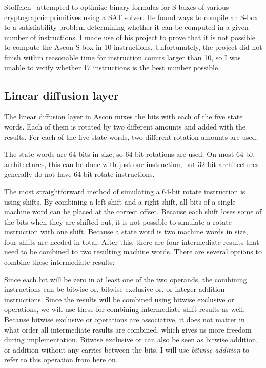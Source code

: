 Stoffelen~\cite{sat} attempted to optimize binary formulas for S-boxes of
various cryptographic primitives using a SAT solver. He found ways to compile an
S-box to a satisfiability problem determining whether it can be computed in a
given number of instructions. I made use of his project to prove that it is not
possible to compute the Ascon S-box in 10 instructions. Unfortunately, the
project did not finish within reasonable time for instruction counts larger than
10, so I was unable to verify whether 17 instructions is the best number
possible.

\subsection{Linear diffusion layer}

The linear diffusion layer in Ascon mixes the bits with each of the five state
words. Each of them is rotated by two different amounts and added with the
results. For each of the five state words, two different rotation amounts are
used.

The state words are 64 bits in size, so 64-bit rotations are used. On most
64-bit architectures, this can be done with just one instruction, but 32-bit
architectures generally do not have 64-bit rotate instructions.

The most straightforward method of simulating a 64-bit rotate instruction is
using shifts. By combining a left shift and a right shift, all bits of a single
machine word can be placed at the correct offset. Because each shift loses some
of the bits when they are shifted out, it is not possible to simulate a rotate
instruction with one shift. Because a state word is two machine words in size,
four shifts are needed in total. After this, there are four intermediate results
that need to be combined to two resulting machine words. There are several
options to combine these intermediate results:

Since each bit will be zero in at least one of the two operands, the combining
instructions can be bitwise or, bitwise exclusive or, or integer addition
instructions. Since the results will be combined using bitwise exclusive or
operations, we will use these for combining intermediate shift results as well.
Because bitwise exclusive or operations are associative, it does not matter in
what order all intermediate results are combined, which gives us more freedom
during implementation. Bitwise exclusive or can also be seen as bitwise
addition, or addition without any carries between the bits. I will use
\emph{bitwise addition} to refer to this operation from here on.

